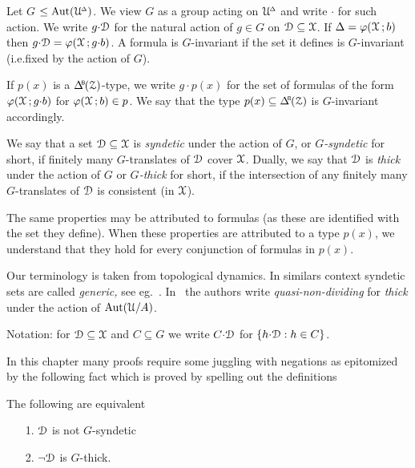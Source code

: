 Let \emph{$G$\/} $\le{\rm Aut}(\EuScript U\kern-.2ex^{\scriptscriptstyle\Delta})$.
We view $G$ as a group acting on $\EuScript U\kern-.2ex^{\scriptscriptstyle\Delta}$ and write ${\cdot}$ for such action.
We write $g{\cdot}\EuScript D$ for the natural action of $g\in G$ on $\EuScript D\subseteq\EuScript X$.
If $\Delta=\varphi(\EuScript X\,;b)$ then $g{\cdot}\EuScript D=\varphi(\EuScript X\,;g{\cdot}b)$.
A formula is $G$-invariant if the set it defines is $G$-invariant (i.e.\@ fixed by the action of $G$).

If $p(x)$ is a $\BDelta(\Z)$-type, we write $g{\cdot}p(x)$ for the set of formulas of the form $\varphi(\EuScript X\,;g{\cdot}b)$ for $\varphi(\EuScript X\,;b)\in p$.
We say that the type $p(x)\subseteq\BDelta(\Z)$ is $G$-invariant accordingly.

We say that a set $\EuScript D\subseteq\EuScript X$ is \emph{syndetic\/} under the action of $G$, or \emph{$G$-syndetic\/} for short, if finitely many $G$-translates of $\EuScript D$ cover $\EuScript X$.
Dually, we say that $\EuScript D$ is \emph{thick\/} under the action of $G$ or \emph{$G$-thick\/} for short, if the intersection of any finitely many $G$-translates of $\EuScript D$ is consistent (in $\EuScript X$).

The same properties may be attributed to formulas (as these are identified with the set they define).
When these properties are attributed to a type $p(x)$, we understand that they hold for every conjunction of formulas in $p(x)$.

Our terminology is taken from topological dynamics.
In similars context syndetic sets are called \textit{generic,} see eg.~\cite{Ne}.
In~\cite{CK} the authors write \textit{quasi-non-dividing\/} for \textit{thick\/} under the action of ${\rm Aut}(\EuScript U/A)$.

Notation: for $\EuScript D\subseteq\EuScript X$ and $C\subseteq G$ we write \emph{$C{\cdot}\EuScript D$\/} for $\{h{\cdot}\EuScript D: h\in C\}$.

In this chapter many proofs require some juggling with negations as epitomized by the following fact which is proved by spelling out the definitions

\begin{fact}\label{fact_fip}
  The following are equivalent
  \begin{itemize}
    \item[1.] $\EuScript D$ is not $G$-syndetic
    \item[2.] $\neg\EuScript D$ is $G$-thick.
  \end{itemize}\smallskip
\end{fact}



